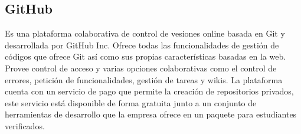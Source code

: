 \documentclass{article}
\begin{document}
    \subsection{GitHub}
        Es una plataforma colaborativa de control de vesiones online basada en Git y desarrollada por GitHub Inc. Ofrece todas las funcionalidades de gestión de códigos que ofrece Git así como sus propias características basadas en la web. Provee control de acceso y varias opciones colaborativas como el control de errores, petición de funcionalidades, gestión de tareas y wikis. La plataforma cuenta con un servicio de pago que permite la creación de repositorios privados, este servicio está disponible de forma gratuita junto a un conjunto de herramientas de desarrollo que la empresa ofrece en un paquete para estudiantes verificados.



\end{document}
